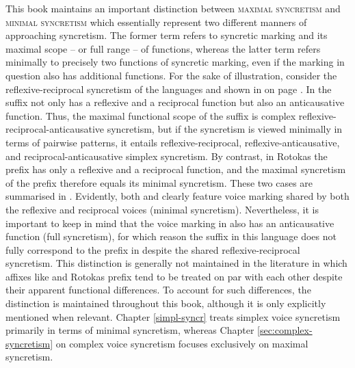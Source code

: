 This book maintains an important distinction between \textsc{maximal syncretism} and \textsc{minimal syncretism} which essentially represent two different manners of approaching syncretism. The former term refers to syncretic marking and its maximal scope -- or full range -- of functions, whereas the latter term refers minimally to precisely two functions of syncretic marking, even if the marking in question also has additional functions. For the sake of illustration, consider the reflexive-reciprocal syncretism of the languages  and  shown in  on page \pageref{tab:ch1:examples}. In  the suffix  not only has a reflexive and a reciprocal function but also an anticausative function. Thus, the maximal functional scope of the suffix  is complex reflexive-reciprocal-anticausative syncretism, but if the syncretism is viewed minimally in terms of pairwise patterns, it entails reflexive-reciprocal, reflexive-anticausative, and reciprocal-anticausative simplex syncretism. By contrast, in Rotokas the prefix  has only a reflexive and a reciprocal function, and the maximal syncretism of the prefix therefore equals its minimal syncretism. These two cases are summarised in . Evidently, both  and  clearly feature voice marking shared by both the reflexive and reciprocal voices (minimal syncretism). Nevertheless, it is important to keep in mind that the voice marking in  also has an anticausative function (full syncretism), for which reason the suffix  in this language does not fully correspond to the prefix  in  despite the shared reflexive-reciprocal syncretism. This distinction is generally not maintained in the literature in which affixes like   and Rotokas prefix  tend to be treated on par with each other despite their apparent functional differences. To account for such differences, the distinction is maintained throughout this book, although it is only explicitly mentioned when relevant. Chapter \ref{simpl-syncr} treats simplex voice syncretism primarily in terms of minimal syncretism, whereas Chapter \ref{sec:complex-syncretism} on complex voice syncretism focuses exclusively on maximal syncretism.

